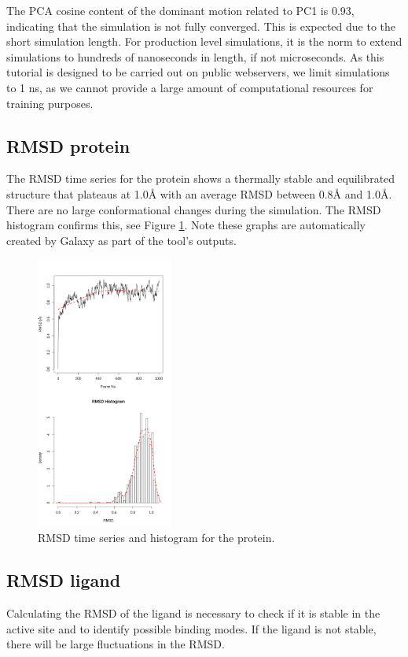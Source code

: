 \documentclass[twocolumn]{bmcart}%
\begin{document}
The PCA cosine content of the dominant motion related to PC1 is 0.93, indicating that the simulation is not fully converged. This is expected due to the short simulation length. For production level simulations, it is the norm to extend simulations to hundreds of nanoseconds in length, if not microseconds. As this tutorial is designed to be carried out on public webservers, we limit simulations to 1 ns, as we cannot provide a large amount of computational resources for training purposes. 

\subsection*{RMSD protein}
The RMSD time series for the protein shows a thermally stable and equilibrated structure that plateaus at 1.0{\AA} with an average RMSD between 0.8{\AA} and 1.0{\AA}. There are no large conformational changes during the simulation. The RMSD histogram confirms this, see Figure \ref{fig:rmsdprotein}. Note these graphs are automatically created by Galaxy as part of the tool's outputs.

\begin{figure}[ht!]
  \includegraphics[width=0.4\textwidth]{htmd_analysis_rmsd1_merge}
  \caption{
      RMSD time series and histogram for the protein.}
  \label{fig:rmsdprotein}
\end{figure}

\subsection*{RMSD ligand}
Calculating the RMSD of the ligand is necessary to check if it is stable in the active site and to identify possible binding modes. If the ligand is not stable, there will be large fluctuations in the RMSD.
\end{document}
